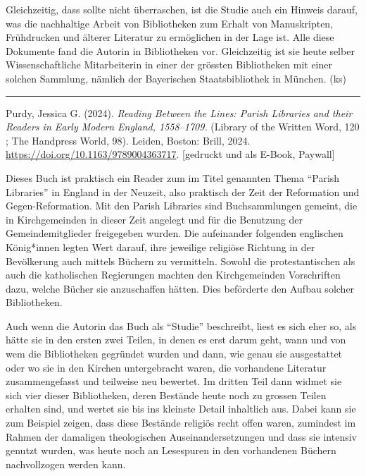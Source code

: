 \documentclass[a4paper,
fontsize=11pt,
oneside,
numbers=noperiodatend,
parskip=half-,
bibliography=totoc,
final
]{scrartcl}
\begin{document}
Gleichzeitig, dass sollte nicht überraschen, ist die Studie auch ein
Hinweis darauf, was die nachhaltige Arbeit von Bibliotheken zum Erhalt
von Manuskripten, Frühdrucken und älterer Literatur zu ermöglichen in
der Lage ist. Alle diese Dokumente fand die Autorin in Bibliotheken vor.
Gleichzeitig ist sie heute selber Wissenschaftliche Mitarbeiterin in
einer der grössten Bibliotheken mit einer solchen Sammlung, nämlich der
Bayerischen Staatsbibliothek in München. (ks)

\begin{center}\rule{0.5\linewidth}{0.5pt}\end{center}

Purdy, Jessica G. (2024). \emph{Reading Between the Lines: Parish
Libraries and their Readers in Early Modern England, 1558--1709.}
(Library of the Written Word, 120 ; The Handpress World, 98). Leiden,
Boston: Brill, 2024. \url{https://doi.org/10.1163/9789004363717}.
{[}gedruckt und als E-Book, Paywall{]}

Dieses Buch ist praktisch ein Reader zum im Titel genannten Thema
\enquote{Parish Libraries} in England in der Neuzeit, also praktisch der
Zeit der Reformation und Gegen-Reformation. Mit den Parish Libraries
sind Buchsammlungen gemeint, die in Kirchgemeinden in dieser Zeit
angelegt und für die Benutzung der Gemeindemitglieder freigegeben
wurden. Die aufeinander folgenden englischen König*innen legten Wert
darauf, ihre jeweilige religiöse Richtung in der Bevölkerung auch
mittels Büchern zu vermitteln. Sowohl die protestantischen als auch die
katholischen Regierungen machten den Kirchgemeinden Vorschriften dazu,
welche Bücher sie anzuschaffen hätten. Dies beförderte den Aufbau
solcher Bibliotheken.

Auch wenn die Autorin das Buch als \enquote{Studie} beschreibt, liest es
sich eher so, als hätte sie in den ersten zwei Teilen, in denen es erst
darum geht, wann und von wem die Bibliotheken gegründet wurden und dann,
wie genau sie ausgestattet oder wo sie in den Kirchen untergebracht
waren, die vorhandene Literatur zusammengefasst und teilweise neu
bewertet. Im dritten Teil dann widmet sie sich vier dieser Bibliotheken,
deren Bestände heute noch zu grossen Teilen erhalten sind, und wertet
sie bis ins kleinste Detail inhaltlich aus. Dabei kann sie zum Beispiel
zeigen, dass diese Bestände religiös recht offen waren, zumindest im
Rahmen der damaligen theologischen Auseinandersetzungen und dass sie
intensiv genutzt wurden, was heute noch an Lesespuren in den vorhandenen
Büchern nachvollzogen werden kann.
\end{document}
